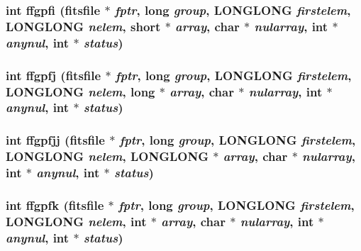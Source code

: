 \subsubsection{\setlength{\rightskip}{0pt plus 5cm}int ffgpfi (\bf{fitsfile} $\ast$ {\em fptr}, long {\em group}, \bf{LONGLONG} {\em firstelem}, \bf{LONGLONG} {\em nelem}, short $\ast$ {\em array}, char $\ast$ {\em nularray}, int $\ast$ {\em anynul}, int $\ast$ {\em status})}\label{src_2fitsio_8h_f29072567714e2050dec2f834a1890c8}


\subsubsection{\setlength{\rightskip}{0pt plus 5cm}int ffgpfj (\bf{fitsfile} $\ast$ {\em fptr}, long {\em group}, \bf{LONGLONG} {\em firstelem}, \bf{LONGLONG} {\em nelem}, long $\ast$ {\em array}, char $\ast$ {\em nularray}, int $\ast$ {\em anynul}, int $\ast$ {\em status})}\label{src_2fitsio_8h_348a086c25d23b4b453e20483c0552a2}


\subsubsection{\setlength{\rightskip}{0pt plus 5cm}int ffgpfjj (\bf{fitsfile} $\ast$ {\em fptr}, long {\em group}, \bf{LONGLONG} {\em firstelem}, \bf{LONGLONG} {\em nelem}, \bf{LONGLONG} $\ast$ {\em array}, char $\ast$ {\em nularray}, int $\ast$ {\em anynul}, int $\ast$ {\em status})}\label{src_2fitsio_8h_b8dd1aed0cf184dd27347a3ad89bd888}


\subsubsection{\setlength{\rightskip}{0pt plus 5cm}int ffgpfk (\bf{fitsfile} $\ast$ {\em fptr}, long {\em group}, \bf{LONGLONG} {\em firstelem}, \bf{LONGLONG} {\em nelem}, int $\ast$ {\em array}, char $\ast$ {\em nularray}, int $\ast$ {\em anynul}, int $\ast$ {\em status})}\label{src_2fitsio_8h_39fded4193b93f54f993961de406751f}


